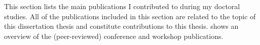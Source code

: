 \newcommand{\auth}\emph
\newcommand{\core}[3]{\href{https://portal.core.edu.au/conf-ranks/#3/}{CORE#1 conference rank: #2}}
\newcommand{\wos}[1]{\href{https://www.webofscience.com/wos/woscc/full-record/WOS:#1}{Web of Science record: #1}}
\newcommand{\scholar}{Source: \href{https://scholar.google.com/}{Google Scholar}. Date extracted: \DTMdisplaydate{2024}{9}{11}{-1}.}
\newcommand{\citations}[4]{\href{https://scholar.google.com/scholar?cites=#4}{Number of citations\footnote{\scholar{} Excluding self-citations.}: #2}}

This section lists the main publications I contributed to during my doctoral studies.
All of the publications included in this section are related to the topic of this dissertation thesis and constitute contributions to this thesis.
 shows an overview of the (peer-reviewed) conference and workshop publications.


